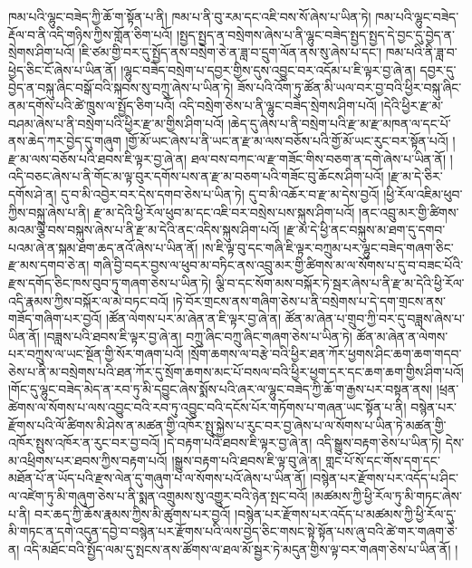 ཁམ་པའི་ལྷུང་བཟེད་ཀྱི་ཆོ་ག་སྟོན་པ་ནི། ཁམ་པ་ནི་བུ་རམ་དང་འཇི་བས་སོ་ཞེས་པ་ཡིན་ཏེ། ཁམ་པའི་ལྷུང་བཟེད་རྡོལ་བ་ནི་འདི་གཉིས་ཀྱིས་གློན་ཅིག་པའོ། །སྤྱད་སྤྱད་ན་བསྲེགས་ཞེས་པ་ནི་ལྷུང་བཟེད་སྤྱད་སྤྱད་དེ་བྱང་དུ་བྱེད་ན་སྲེགས་ཤིག་པའོ། །ཇི་ཙམ་གྱི་བར་དུ་སྤྱོད་ནས་བསྲེག་ཅེ་ན་ཟླ་བ་དྲུག་ལོན་ནས་སུ་ཞེས་པ་དང་། ཁམ་པའི་ནི་ཟླ་བ་ཕྱེད་ཅིང་ངོ་ཞེས་པ་ཡིན་ནོ། །ལྷུང་བཟེད་བསྲེག་པ་དབྱར་གྱིས་དུས་འབྱུང་བར་འདོམ་པ་ཇི་ལྟར་བྱ་ཞེ་ན། དབྱར་དུ་བྱེད་ན་བསྐུ་ཞིང་བསྒོ་བའི་སྐབས་སུ་བཀྲུ་ཞེས་པ་ཡིན་ཏེ། ཟོས་པའི་འོག་ཏུ་ཚོན་མི་ཡལ་བར་བྱ་བའི་ཕྱིར་བསྐུ་ཞིང་ནམ་དགོས་པའི་ཚེ་ཁྲུས་ལ་སྤྱོད་ཅིག་པའོ། འདི་བསྲེག་ཅེས་པ་ནི་ལྷུང་བཟེད་སྲེགས་ཤིག་པའོ། །དེའི་ཕྱིར་རྫ་མ་བཤམ་ཞེས་པ་ནི་བསྲེག་པའི་ཕྱིར་རྫ་མ་གྱིས་ཤིག་པའོ། །ཆེད་དུ་ཞེས་པ་ནི་བསྲེག་པའི་རྫ་མ་རྫ་མཁན་ལ་དང་པོ་ནས་ཆེད་ཀར་བྱེད་དུ་གཞུག །གྱོ་མོ་ཡང་ཞེས་པ་ནི་ཡང་ན་རྫ་མ་ལས་བཅོས་པའི་གྱོ་མོ་ཡང་རུང་བར་སྟོན་པའོ། །རྫ་མ་ལས་བཅོས་པའི་ཐབས་ཇི་ལྟར་བྱ་ཞེ་ན། ཐལ་བས་བཀང་ལ་རྫ་གཟོང་གིས་བཅག་ན་དགེ་ཞེས་པ་ཡིན་ནོ། །འདི་བཅང་ཞེས་པ་ནི་གོང་མ་ལྟ་བུར་དགོས་པས་ན་རྫ་མ་བཅག་པའི་གཟོང་བུ་ཆོངས་ཤིག་པའོ། །རྫ་མ་དེ་ཅིར་དགོས་ཤེ་ན། དུ་བ་མི་འབྱེར་བར་དེས་དགབ་ཅེས་པ་ཡིན་ཏེ། དུ་བ་མི་འཆོར་བ་རྫ་མ་དེས་བྱའོ། །ཕྱི་རོལ་འཇིམ་ཕུབ་ཀྱིས་བསྐུ་ཞེས་པ་ནི། རྫ་མ་དེའི་ཕྱི་རོལ་ཕུབ་མ་དང་འཇི་བར་བསྲེས་པས་སྐུས་ཤིག་པའོ། །ནང་འབྲུ་མར་གྱི་ཚིགས་མའམ་ལྕི་བས་བསྐུས་ཞེས་པ་ནི་རྫ་མ་དེའི་ནང་འདིས་སྐུས་ཤིག་པའོ། །རྫ་མ་དེ་ཕྱི་ནང་བསྐུས་མ་ཐག་དུ་དགབ་པའམ་ཞེ་ན་སྐམ་ཐག་ཆད་ནའོ་ཞེས་པ་ཡིན་ནོ། །ས་ཇི་ལྟ་བུ་དང་གཞི་ཇི་ལྟར་བཀྲུམ་པར་ལྷུང་བཟེད་གཞག་ཅིང་རྫ་མས་དགབ་ཅེ་ན། གཞི་བྱི་བདར་བྱས་ལ་ཕུབ་མ་བཏིང་ནས་འབྲུ་མར་གྱི་ཚིགས་མ་ལ་སོགས་པ་དུ་བ་བཟང་པོའི་རྫས་དགོད་ཅིང་ཁས་བུབ་ཏུ་གཞག་ཅེས་པ་ཡིན་ཏེ། ལྕི་བ་དང་སོག་མས་བསྐོར་ཏེ་སྦར་ཞེས་པ་ནི་རྫ་མ་དེའི་ཕྱི་རོལ་འདི་རྣམས་ཀྱིས་བསྐོར་ལ་མེ་བཏང་བའོ། །ཏེ་བོར་གྲངས་ནས་གཞིག་ཅེས་པ་ནི་བསྲེགས་པ་དེ་དག་གྲངས་ནས་གཟོད་གཞིག་པར་བྱའོ། །ཚོན་ལེགས་པར་མ་ཞེན་ན་ཇི་ལྟར་བྱ་ཞེ་ན། ཚོན་མ་ཞེན་པ་གྲུབ་ཀྱི་བར་དུ་བཟླས་ཞེས་པ་ཡིན་ནོ། །བཟླས་པའི་ཐབས་ཇི་ལྟར་བྱ་ཞེ་ན། བཀྲུ་ཞིང་བཀྲུ་ཞིང་གཞག་ཅེས་པ་ཡིན་ཏེ། ཚོན་མ་ཞེན་ན་ལེགས་པར་བཀྲུས་ལ་ཡང་སྔོན་གྱི་སོར་གཞག་པའོ། །སྲོག་ཆགས་ལ་བརྩེ་བའི་ཕྱིར་ཐན་ཀོར་ཕྱགས་ཤིང་ཆག་ཆག་གདབ་ཅེས་པ་ནི་མ་བསྲེགས་པའི་ཐན་ཀོར་དུ་སྲོག་ཆགས་མང་པོ་བསལ་བའི་ཕྱིར་ཕྱག་དར་དང་ཆག་ཆག་གྱིས་ཤིག་པའོ། །གོང་དུ་ལྷུང་བཟེད་མེད་ན་རབ་ཏུ་མི་དབྱུང་ཞེས་སྨོས་པའི་ཞར་ལ་ལྷུང་བཟེད་ཀྱི་ཆོ་ག་རྒྱས་པར་བསྟན་ནས། །ཕྲན་ཚེགས་ལ་སོགས་པ་ལས་འབྱུང་བའི་རབ་ཏུ་འབྱུང་བའི་དངོས་པོར་གཏོགས་པ་གཞན་ཡང་སྟོན་པ་ནི། བསྙེན་པར་རྫོགས་པའི་ལོ་ཚིགས་མི་ཤེས་ན་མཚན་གྱི་འཁོར་སྤུ་སྐྱེས་པ་རུང་བར་བྱ་ཞེས་པ་ལ་སོགས་པ་ཡིན་ཏེ་མཚན་གྱི་འཁོར་སྤུས་འཁོར་ན་རུང་བར་བྱ་བའོ། །དེ་བརྟག་པའི་ཐབས་ཇི་ལྟར་བྱ་ཞེ་ན། འདི་སྒྱུས་བརྟག་ཅེས་པ་ཡིན་ཏེ། དེས་མ་འཕྲིགས་པར་ཐབས་ཀྱིས་བརྟག་པའོ། །སྒྱུས་བརྟག་པའི་ཐབས་ཇི་ལྟ་བུ་ཞེ་ན། གླང་པོ་སོ་དང་གོས་དག་དང་མཐོན་པོ་ན་ཡོད་པའི་རྫས་ལེན་དུ་གཞུག་པ་ལ་སོགས་པའོ་ཞེས་པ་ཡིན་ནོ། །བསྙེན་པར་རྫོགས་པར་འདོད་པ་ཤིང་ལ་འཛེག་ཏུ་མི་གཞུག་ཅེས་པ་ནི་སྨན་འགྲུམས་སུ་འགྱུར་བའི་ཉེན་སྤང་བའོ། །མཚམས་ཀྱི་ཕྱི་རོལ་ཏུ་མི་གཏང་ཞེས་པ་ནི། བར་ཆད་ཀྱི་ཆོས་རྣམས་ཀྱིས་མི་ཚུགས་པར་བྱའོ། །བསྙེན་པར་རྫོགས་པར་འདོད་པ་མཚམས་ཀྱི་ཕྱི་རོལ་དུ་མི་གཏང་ན་དགེ་འདུན་དབྱེ་བ་བསྙེན་པར་རྫོགས་པའི་ལས་བྱེད་ཅིང་གསང་སྟེ་སྟོན་པས་ཞུ་བའི་ཚེ་གར་གཞག་ཅེ་ན། འདི་མཐོང་བའི་སྤྱོད་ལམ་དུ་སྤངས་ནས་ཚོགས་ལ་ཐལ་མོ་སྦྱར་ཏེ་མདུན་གྱིས་ལྟ་བར་གཞག་ཅེས་པ་ཡིན་ནོ། །
